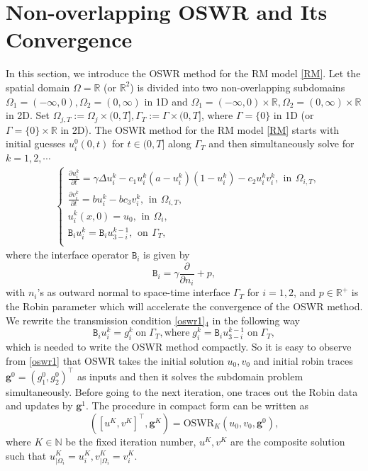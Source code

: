 \documentclass[11pt]{article}
\begin{document}
\section{Non-overlapping OSWR and Its Convergence}\label{Section3}
In this section, we introduce the OSWR method for the RM model \eqref{RM}. Let the spatial domain $\Omega = \mathbb{R}$ (or $\mathbb{R}^2$) is divided into two non-overlapping subdomains $\Omega_{1} = (-\infty, 0), \Omega_{2} = (0, \infty)$ in 1D and  $\Omega_{1} = (-\infty, 0)\times\mathbb{R}, \Omega_{2} = (0, \infty)\times\mathbb{R}$ in 2D. Set $\Omega_{j,T}:=\Omega_{j}\times(0, T], \Gamma_{T}:=\Gamma\times(0, T]$, where $\Gamma=\{ 0\}$ in 1D (or $\Gamma=\{ 0\}\times\mathbb{R}$ in 2D). The OSWR method for the RM model \eqref{RM} starts with initial guesses $u_i^0(0, t)$ for $t\in(0, T]$ along $\Gamma_{T}$ and then simultaneously solve for $k=1, 2, \cdots$
\begin{equation}\label{oswr1}
\begin{aligned}
&\left\{
\begin{aligned}
\frac{\partial u_i^k}{\partial t}  = \gamma \Delta u_i^k - c_1u_i^k(a-u_i^k)(1-u_i^k) - c_2u_i^kv_i^k, \,\ \text{in} \,\ \Omega_{i,T},\\
\frac{\partial v_i^k}{\partial t}  = bu_i^k - bc_3v_i^k ,\,\ \text{in} \,\ \Omega_{i,T},  \\
u_i^k(x, 0)
 = u_0,\,\ \text{in}\,\ \Omega_{i},\\
\mathtt{B}_i u_i^k
 = 
\mathtt{B}_i u_{3-i}^{k-1},
\,\ \mbox{on}\,\ \Gamma_{T},\\
\end{aligned}\right.
\end{aligned}
\end{equation}
where the interface operator $\mathtt{B}_i$ is given by 
\begin{equation}
\mathtt{B}_i = \gamma\frac{\partial}{\partial n_i} + p,
\end{equation}
with $n_i$'s as outward normal to space-time interface $\Gamma_T$ for $i=1, 2$, and $p\in\mathbb{R}^{+}$ is the Robin parameter which will accelerate the convergence of the OSWR method. We rewrite the transmission condition \eqref{oswr1}$_4$ in the following way
\begin{equation}
\mathtt{B}_i u_i^{k}=g_i^{k}\; \text{on}\; \Gamma_{T},  \text{where}\; g_i^{k}= \mathtt{B}_i u_{3-i}^{k-1}\; \text{on}\; \Gamma_{T}, 
\end{equation}
which is needed to write the OSWR method compactly. So it is easy to observe from \eqref{oswr1} that OSWR takes the initial solution $u_0, v_0$ and initial robin traces $\boldsymbol{g}^{0}=(g_1^{0}, g_2^{0})^{\top}$ as inputs and then it solves the subdomain problem simultaneously. Before going to the next iteration, one traces out the Robin data and updates by $\boldsymbol{g}^{1}$.  The procedure in compact form can be written as 
\begin{equation}
\left( [u^{K}, v^{K}]^{\top}, \boldsymbol{g}^{K} \right)= \text{OSWR}_{K} \left( u_0,v_0, \boldsymbol{g}^{0} \right), 
\end{equation}
where $K\in\mathbb{N}$ be the fixed iteration number, $u^{K}, v^{K}$ are the composite solution such that $u^{K}_{|\Omega_i}=u_i^{K}, v^{K}_{|\Omega_i}=v_i^{K}$.  
\end{document}
